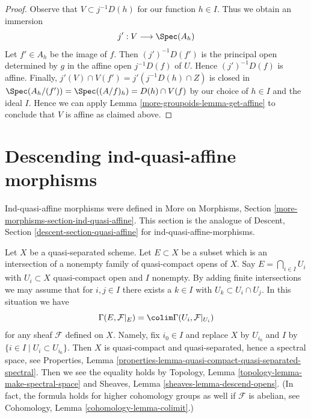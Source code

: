 \begin{proof}
\medskip\noindent
Observe that $V \subset j^{-1}D(h)$ for our function $h \in I$.
Thus we obtain an immersion
$$
j' : V \longrightarrow \Spec(A_h)
$$
Let $f' \in A_h$ be the image of $f$. Then $(j')^{-1}D(f')$
is the principal open determined by $g$ in the affine
open $j^{-1}D(f)$ of $U$.
Hence $(j')^{-1}D(f)$ is affine. Finally,
$j'(V) \cap V(f') = j'(j^{-1}D(h) \cap Z)$
is closed in $\Spec(A_h/(f')) = \Spec((A/f)_h) = D(h) \cap V(f)$
by our choice of $h \in I$ and the ideal $I$. Hence we can apply
Lemma \ref{more-groupoids-lemma-get-affine}
to conclude that $V$ is affine as claimed above.
\end{proof}

\section{Descending ind-quasi-affine morphisms}
\label{more-groupoids-section-ind-quasi-affine}
Ind-quasi-affine morphisms were defined in
More on Morphisms, Section \ref{more-morphisms-section-ind-quasi-affine}.
This section is the analogue of
Descent, Section \ref{descent-section-quasi-affine}
for ind-quasi-affine-morphisms.

\medskip\noindent
Let $X$ be a quasi-separated scheme. Let $E \subset X$ be a subset
which is an intersection of a nonempty family of quasi-compact opens of $X$.
Say $E = \bigcap_{i \in I} U_i$ with $U_i \subset X$ quasi-compact open
and $I$ nonempty.
By adding finite intersections we may assume that for $i, j \in I$
there exists a $k \in I$ with $U_k \subset U_i \cap U_j$.
In this situation we have
\begin{equation}
\label{equation-sections-of-intersection}
\Gamma(E, \mathcal{F}|_E) = \colim \Gamma(U_i, \mathcal{F}|_{U_i})
\end{equation}
for any sheaf $\mathcal{F}$ defined on $X$. Namely, fix $i_0 \in I$
and replace $X$ by $U_{i_0}$ and $I$ by
$\{i \in I \mid U_i \subset U_{i_0}\}$. Then $X$ is quasi-compact
and quasi-separated, hence a spectral space, see
Properties, Lemma
\ref{properties-lemma-quasi-compact-quasi-separated-spectral}.
Then we see the equality holds by
Topology, Lemma \ref{topology-lemma-make-spectral-space} and
Sheaves, Lemma \ref{sheaves-lemma-descend-opens}.
(In fact, the formula holds for higher cohomology groups
as well if $\mathcal{F}$ is abelian, see
Cohomology, Lemma \ref{cohomology-lemma-colimit}.)

